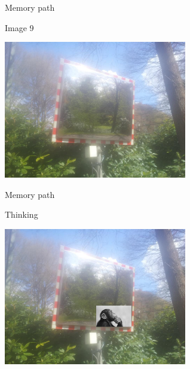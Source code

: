 \begin{frame}{Memory path}
  \begin{block}{Image 9}
    \begin{center}
      \includegraphics[height=6cm]{img/loci/09.jpg}
    \end{center}
  \end{block}
\end{frame}
\begin{frame}{Memory path}
  \begin{block}{Thinking}
    \begin{center}
      \includegraphics[height=6cm]{img/loci/09-think.jpg}
    \end{center}
  \end{block}
\end{frame}

